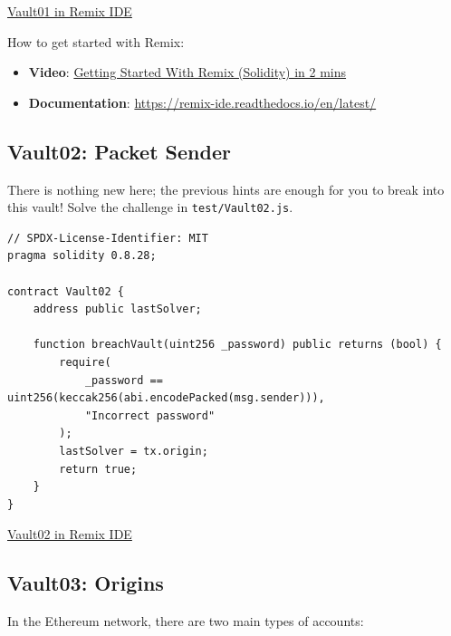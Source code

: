 \documentclass[12pt]{article}
\begin{document}
\medskip
\noindent
\href{https://remix.ethereum.org/?#activate=solidity&url=https://github.com/radovluk/unbreakable-vault/contracts/Vault01.sol&lang=en&optimize=false&runs=200&evmVersion=null&version=soljson-v0.8.28+commit.7893614a.js}{Vault01 in Remix IDE}

\medskip
\noindent
How to get started with Remix:
\begin{itemize}
    \item \textbf{Video}: \href{https://www.youtube.com/watch?v=vH8T3In6ZkE&t=7s&ab_channel=EatTheBlocks}{Getting Started With Remix (Solidity) in 2 mins}
    \item \textbf{Documentation}: \href{https://remix-ide.readthedocs.io/en/latest/}{https://remix-ide.readthedocs.io/en/latest/}
\end{itemize}

\subsection*{Vault02: Packet Sender}

There is nothing new here; the previous hints are enough for you to break into
this vault! Solve the challenge in \texttt{test/Vault02.js}.

\noindent
\begin{minipage}{\textwidth}
    \begin{lstlisting}[language=Solidity]
// SPDX-License-Identifier: MIT
pragma solidity 0.8.28;
 
contract Vault02 {
    address public lastSolver;
 
    function breachVault(uint256 _password) public returns (bool) {
        require(
            _password == uint256(keccak256(abi.encodePacked(msg.sender))),
            "Incorrect password"
        );
        lastSolver = tx.origin;
        return true;
    }
}
\end{lstlisting}
\end{minipage}

\medskip
\noindent
\href{https://remix.ethereum.org/?#activate=solidity&url=https://github.com/radovluk/unbreakable-vault/contracts/Vault02.sol&lang=en&optimize=false&runs=200&evmVersion=null&version=soljson-v0.8.28+commit.7893614a.js}{Vault02 in Remix IDE}

\subsection*{Vault03: Origins}

In the Ethereum network, there are two main types of accounts:
\end{document}
